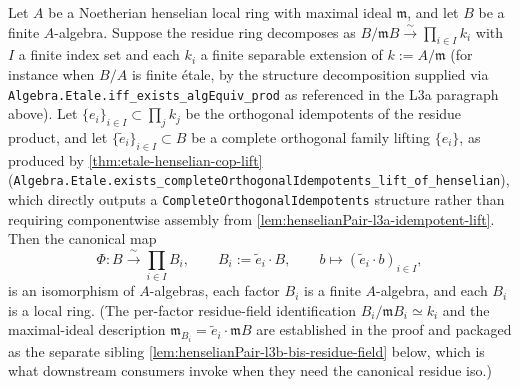 \begin{lemma}
\label{lem:henselianPair-l3b-product-decomposition}
Let $A$ be a Noetherian henselian local ring with maximal ideal
$\mathfrak m$, and let $B$ be a finite $A$-algebra. Suppose the
residue ring decomposes as
$B / \mathfrak m B \xrightarrow{\sim} \prod_{i \in I} k_i$ with
$I$ a finite index set and each $k_i$ a finite separable
extension of $k := A / \mathfrak m$ (for instance when $B/A$ is
finite étale, by the structure decomposition supplied via
\texttt{Algebra.Etale.iff\_exists\_algEquiv\_prod} as referenced in
the L3a paragraph above). Let
$\{e_i\}_{i \in I} \subset \prod_j k_j$ be the orthogonal
idempotents of the residue product, and let
$\{\tilde e_i\}_{i \in I} \subset B$ be a complete orthogonal
family lifting $\{e_i\}$, as produced by
\cref{thm:etale-henselian-cop-lift}
(\texttt{Algebra.Etale.exists\_completeOrthogonalIdempotents\_lift\_of\_henselian}),
which directly outputs a \texttt{CompleteOrthogonalIdempotents}
structure rather than requiring componentwise assembly from
\cref{lem:henselianPair-l3a-idempotent-lift}.
Then the canonical map
\[
  \Phi : B \xrightarrow{\ \sim\ }
  \prod_{i \in I} B_i,
  \qquad
  B_i := \tilde e_i \cdot B,
  \qquad
  b \longmapsto (\tilde e_i \cdot b)_{i \in I},
\]
is an isomorphism of $A$-algebras, each factor $B_i$ is a finite
$A$-algebra, and each $B_i$ is a local ring. (The per-factor
residue-field identification $B_i / \mathfrak m B_i \simeq k_i$
and the maximal-ideal description $\mathfrak m_{B_i} = \tilde e_i
\cdot \mathfrak m B$ are established in the proof and packaged as
the separate sibling
\cref{lem:henselianPair-l3b-bis-residue-field} below, which is
what downstream consumers invoke when they need the canonical
residue iso.)
\end{lemma}

